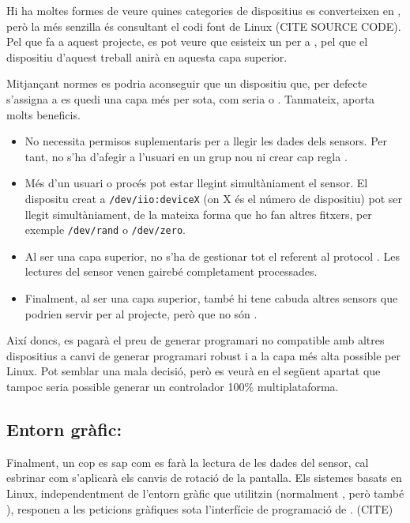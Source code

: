 Hi ha moltes formes de veure quines categories de dispositius  es
converteixen en , però la més senzilla és consultant el codi
font de Linux (CITE SOURCE CODE). Pel que fa a aquest projecte, es pot veure
que esisteix un  per a , pel que
el dispositiu d'aquest treball anirà en aquesta capa superior.

Mitjançant normes  es podria aconseguir que un dispositiu que, per 
defecte s'assigna a  es quedi una capa més per sota, com seria
 o . Tanmateix,  aporta molts beneficis.

\begin{itemize}
    \item No necessita permisos suplementaris per a llegir les dades dels
    sensors. Per tant, no s'ha d'afegir a l'usuari en un grup nou ni crear
    cap regla .
    \item Més d'un usuari o procés pot estar llegint simultàniament el sensor.
    El dispositu creat a \verb|/dev/iio:deviceX| (on X és el número de
    dispositiu) pot ser llegit simultàniament, de la mateixa forma que ho fan
    altres fitxers, per exemple \verb|/dev/rand| o \verb|/dev/zero|.
    \item Al ser una capa superior, no s'ha de gestionar tot el referent al
    protocol . Les lectures del sensor venen gairebé completament
    processades.
    \item Finalment, al ser una capa superior, també hi tene cabuda altres
    sensors que podrien servir per al projecte, però que no són .
\end{itemize}

Així doncs, es pagarà el preu de generar programari no compatible amb altres
dispositius a canvi de generar programari robust i a la capa més alta possible
per Linux. Pot semblar una mala decisió, però es veurà en el següent apartat
que tampoc seria possible generar un controlador 100\% multiplataforma.

\subsection{Entorn gràfic: }

Finalment, un cop es sap com es farà la lectura de les dades del sensor, cal
esbrinar com s'aplicarà els canvis de rotació de la pantalla. Els sistemes
basats en Linux, independentment de l'entorn gràfic que utilitzin (normalment
, però també ), responen a les peticions gràfiques sota
l'interfície de programació de . (CITE)

